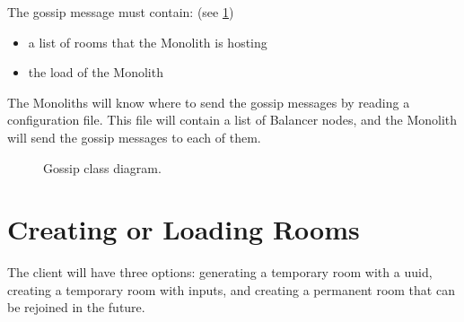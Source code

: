 The gossip message must contain: (see \ref{Figure::gossip-class-diag})
\begin{itemize}
  \item a list of rooms that the Monolith is hosting
  \item the load of the Monolith
\end{itemize}

The Monoliths will know where to send the gossip messages by reading a configuration file. This file will contain a list of Balancer nodes, and the Monolith will send the gossip messages to each of them.

\begin{figure}[!htb]
  \centering
  \caption{\label{Figure::gossip-class-diag} Gossip class diagram.}
\end{figure}

\section{Creating or Loading Rooms}

The client will have three options: generating a temporary room with a uuid, creating a temporary room with inputs, and creating a permanent room that can be rejoined in the future.

